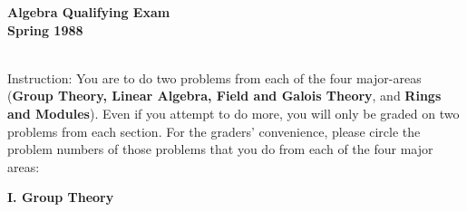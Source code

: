 \documentclass{article}
\begin{document}






\begin{center}\begin{LARGE}
{\bf Algebra Qualifying Exam}\\ 
{\bf Spring 1988}\\ \end{LARGE}
\end{center}
\vspace{0.1in}
\noindent\hrulefill\\

Instruction: You are to do two problems from each of the four major-areas
({\bf Group Theory, Linear Algebra, Field and Galois Theory}, and {\bf Rings
and Modules}). Even if you attempt to do more, you will only be graded on
two problems from each section. For the graders' convenience, please circle
the problem numbers of those problems that you do from each of the four
major areas:

\centerline{{\bf I. Group Theory}}
\end{document}
